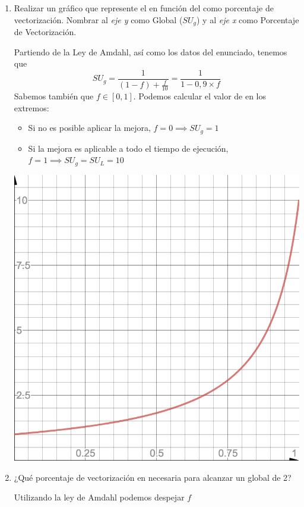 \begin{enumerate}
 \item Realizar un gráfico que represente el \SU en función del como porcentaje de vectorización. Nombrar al \textit{eje y} como \SU Global ($SU_g$) y al \textit{eje x} como Porcentaje de Vectorización.

 Partiendo de la Ley de Amdahl, así como los datos del enunciado, tenemos que $$ SU_g = \frac{1}{(1-f) + \frac{f}{10}} = \frac{1}{1 - 0,9 \times f}$$
 Sabemos también que $ f \in [0, 1] $. Podemos calcular el valor de \SU en los extremos:
 \begin{itemize}
 \item Si no es posible aplicar la mejora, $f = 0 \implies SU_g = 1$
 \item Si la mejora es aplicable a todo el tiempo de ejecución, $ f = 1 \implies SU_g = SU_L = 10 $
 \end{itemize}

 \includegraphics[scale=0.5]{gfx/amdahl_resuelto_1.png}
 
 \threeemdash

 \item ¿Qué porcentaje de vectorización en necesaria para alcanzar un \SU global de 2?

 Utilizando la ley de Amdahl podemos despejar $f$


\end{enumerate}
